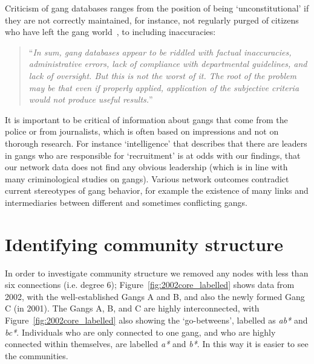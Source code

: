 \documentclass[twocolumn]{svjour3}          %
\theoremstyle{definition}
\begin{document}
Criticism of gang databases ranges from the position of being
`unconstitutional' if they are not correctly maintained, for instance,
not regularly purged of citizens who have left the gang
world~\citep{jacobs:2009}, to including inaccuracies:

\begin{quote}
``{\emph{In sum, gang databases appear to be riddled
with factual inaccuracies, administrative errors, lack of compliance
with departmental guidelines, and lack of oversight. But this is not
the worst of it. The root of the problem may be that even if properly
applied, application of the subjective criteria would not produce
useful results.}}''~\cite{wright:2005}
\end{quote}


It is important to be critical of information about gangs that come
from the police or from journalists, which is often based on
impressions and not on thorough research. For instance `intelligence'
that describes that there are leaders in gangs who are responsible for
`recruitment' is at odds with our findings, that our network data does
not find any obvious leadership (which is in line with many
criminological studies on gangs). Various network outcomes contradict
current stereotypes of gang behavior, for example the existence of
many links and intermediaries between different and sometimes
conflicting gangs.


\section{Identifying community structure}\label{sec:communitystructure}

In order to investigate community structure we removed any nodes with
less than six connections (i.e. degree 6);
Figure~\ref{fig:2002core_labelled} shows data from 2002, with the
well-established Gangs A and B, and also the newly formed Gang C (in
2001). The Gangs A, B, and C are highly interconnected, with
Figure~\ref{fig:2002core_labelled} also showing the `go-betweens',
labelled as \emph{ab*} and \emph{bc*}. Individuals who are only
connected to one gang, and who are highly connected within themselves,
are labelled \emph{a*} and \emph{b*}. In this way it is easier to see
the communities.
\end{document}
